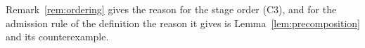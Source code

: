 
Remark~\ref{rem:ordering} gives the reason for the stage order (C3), and for
the admission rule of the definition the reason it gives is
Lemma~\ref{lem:precomposition} and its counterexample.

